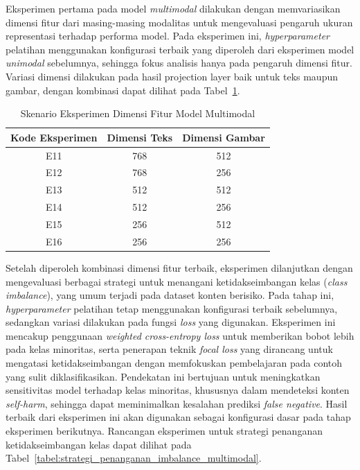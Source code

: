 Eksperimen pertama pada model \textit{multimodal} dilakukan dengan memvariasikan dimensi fitur dari masing-masing modalitas untuk mengevaluasi pengaruh ukuran representasi terhadap performa model. Pada eksperimen ini, \textit{hyperparameter} pelatihan menggunakan konfigurasi terbaik yang diperoleh dari eksperimen model \textit{unimodal} sebelumnya, sehingga fokus analisis hanya pada pengaruh dimensi fitur. Variasi dimensi dilakukan pada hasil projection layer baik untuk teks maupun gambar, dengan kombinasi dapat dilihat pada Tabel~\ref{tabel:variasi_dimensi_fitur_multimodal}.

\begin{table}[H]
    \centering
    \caption{Skenario Eksperimen Dimensi Fitur Model Multimodal}
    \label{tabel:variasi_dimensi_fitur_multimodal}
    \small
    \setlength{\tabcolsep}{8pt}
    \renewcommand{\arraystretch}{1.1}
    \begin{tabular}{c c c}
        \hline
        \textbf{Kode Eksperimen} & \textbf{Dimensi Teks} & \textbf{Dimensi Gambar} \\
        \hline
        E11 & 768 & 512 \\
        E12 & 768 & 256 \\
        E13 & 512 & 512 \\
        E14 & 512 & 256 \\
        E15 & 256 & 512 \\
        E16 & 256 & 256 \\
        \hline
    \end{tabular}
\end{table}

Setelah diperoleh kombinasi dimensi fitur terbaik, eksperimen dilanjutkan dengan mengevaluasi berbagai strategi untuk menangani ketidakseimbangan kelas (\textit{class imbalance}), yang umum terjadi pada dataset konten berisiko. Pada tahap ini, \textit{hyperparameter} pelatihan tetap menggunakan konfigurasi terbaik sebelumnya, sedangkan variasi dilakukan pada fungsi \textit{loss} yang digunakan. Eksperimen ini mencakup penggunaan \textit{weighted cross-entropy loss} untuk memberikan bobot lebih pada kelas minoritas, serta penerapan teknik \textit{focal loss} yang dirancang untuk mengatasi ketidakseimbangan dengan memfokuskan pembelajaran pada contoh yang sulit diklasifikasikan. Pendekatan ini bertujuan untuk meningkatkan sensitivitas model terhadap kelas minoritas, khususnya dalam mendeteksi konten \textit{self-harm}, sehingga dapat meminimalkan kesalahan prediksi \textit{false negative}. Hasil terbaik dari eksperimen ini akan digunakan sebagai konfigurasi dasar pada tahap eksperimen berikutnya. Rancangan eksperimen untuk strategi penanganan ketidakseimbangan kelas dapat dilihat pada Tabel~\ref{tabel:strategi_penanganan_imbalance_multimodal}.

